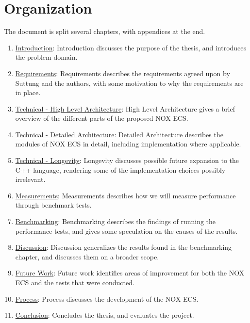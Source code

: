 \section{Organization}
The document is split several chapters, with appendices at the end.
\begin{enumerate}
    \item
    \hyperref[chap:introduction]{Introduction}: Introduction discusses the purpose of the thesis, and introduces the problem domain.
    \item
    \hyperref[chap:requirements]{Requirements}: Requirements describes the requirements agreed upon by Suttung and the authors,
    with some motivation to why the requirements are in place.
    \item
    \hyperref[chap:technical_high_level_architecture]{Technical - High Level Architecture}: High Level Architecture gives a brief overview of the different parts of the proposed NOX ECS.
    \item
    \hyperref[chap:technical_detailed_architecture]{Technical - Detailed Architecture}: Detailed Architecture describes the modules of NOX ECS in detail, including implementation where applicable.
    \item
    \hyperref[chap:technical_longevity]{Technical - Longevity}: Longevity discusses possible future expansion to the C++ language, rendering some of the implementation choices possibly irrelevant.
    \item
    \hyperref[chap:measurements]{Measurements}: Measurements describes how we will measure performance through benchmark tests.
    \item
    \hyperref[chap:benchmarking]{Benchmarking}: Benchmarking describes the findings of running the performance tests, and gives some speculation on the causes of the results.
    \item
    \hyperref[chap:discussion]{Discussion}: Discussion generalizes the results found in the benchmarking chapter, and discusses them on a broader scope.
    \item
    \hyperref[chap:future_work]{Future Work}: Future work identifies areas of improvement for both the NOX ECS and the tests that were conducted.
    \item
    \hyperref[chap:process]{Process}: Process discusses the development of the NOX ECS.
    \item
    \hyperref[chap:conclusion]{Conclusion}: Concludes the thesis, and evaluates the project.
\end{enumerate}
